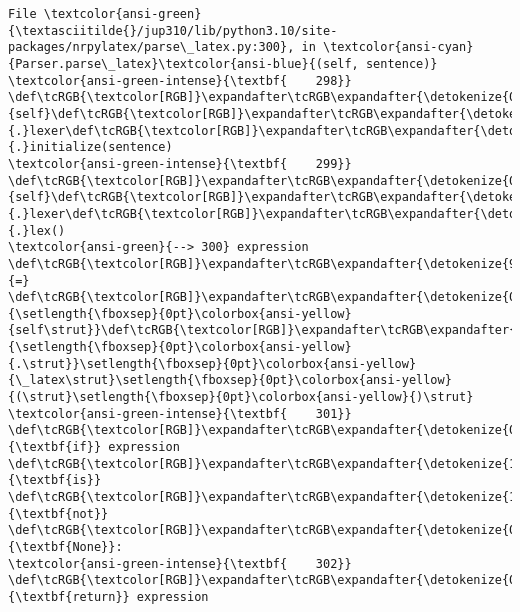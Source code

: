 \documentclass[landscape,letterpaper,10pt,english]{article}
\begin{document}
\begin{Verbatim}[commandchars=\\\{\}, frame=single, framerule=2mm, rulecolor=\color{outerrorbackground}]
File \textcolor{ansi-green}{\textasciitilde{}/jup310/lib/python3.10/site-packages/nrpylatex/parse\_latex.py:300}, in \textcolor{ansi-cyan}{Parser.parse\_latex}\textcolor{ansi-blue}{(self, sentence)}
\textcolor{ansi-green-intense}{\textbf{    298}} \def\tcRGB{\textcolor[RGB]}\expandafter\tcRGB\expandafter{\detokenize{0,135,0}}{self}\def\tcRGB{\textcolor[RGB]}\expandafter\tcRGB\expandafter{\detokenize{98,98,98}}{.}lexer\def\tcRGB{\textcolor[RGB]}\expandafter\tcRGB\expandafter{\detokenize{98,98,98}}{.}initialize(sentence)
\textcolor{ansi-green-intense}{\textbf{    299}} \def\tcRGB{\textcolor[RGB]}\expandafter\tcRGB\expandafter{\detokenize{0,135,0}}{self}\def\tcRGB{\textcolor[RGB]}\expandafter\tcRGB\expandafter{\detokenize{98,98,98}}{.}lexer\def\tcRGB{\textcolor[RGB]}\expandafter\tcRGB\expandafter{\detokenize{98,98,98}}{.}lex()
\textcolor{ansi-green}{--> 300} expression \def\tcRGB{\textcolor[RGB]}\expandafter\tcRGB\expandafter{\detokenize{98,98,98}}{=} \def\tcRGB{\textcolor[RGB]}\expandafter\tcRGB\expandafter{\detokenize{0,135,0}}{\setlength{\fboxsep}{0pt}\colorbox{ansi-yellow}{self\strut}}\def\tcRGB{\textcolor[RGB]}\expandafter\tcRGB\expandafter{\detokenize{98,98,98}}{\setlength{\fboxsep}{0pt}\colorbox{ansi-yellow}{.\strut}}\setlength{\fboxsep}{0pt}\colorbox{ansi-yellow}{\_latex\strut}\setlength{\fboxsep}{0pt}\colorbox{ansi-yellow}{(\strut}\setlength{\fboxsep}{0pt}\colorbox{ansi-yellow}{)\strut}
\textcolor{ansi-green-intense}{\textbf{    301}} \def\tcRGB{\textcolor[RGB]}\expandafter\tcRGB\expandafter{\detokenize{0,135,0}}{\textbf{if}} expression \def\tcRGB{\textcolor[RGB]}\expandafter\tcRGB\expandafter{\detokenize{175,0,255}}{\textbf{is}} \def\tcRGB{\textcolor[RGB]}\expandafter\tcRGB\expandafter{\detokenize{175,0,255}}{\textbf{not}} \def\tcRGB{\textcolor[RGB]}\expandafter\tcRGB\expandafter{\detokenize{0,135,0}}{\textbf{None}}:
\textcolor{ansi-green-intense}{\textbf{    302}}     \def\tcRGB{\textcolor[RGB]}\expandafter\tcRGB\expandafter{\detokenize{0,135,0}}{\textbf{return}} expression


\end{Verbatim}
\end{document}
